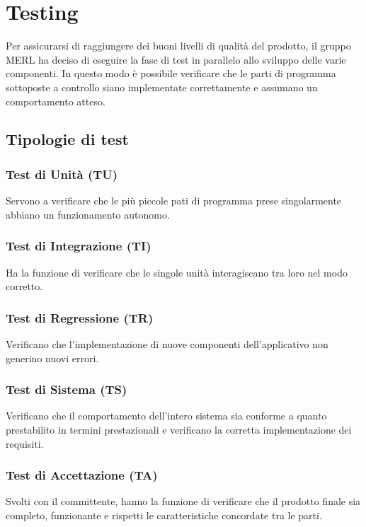 \chapter{Testing}
Per assicurarsi di raggiungere dei buoni livelli di qualità del prodotto, il gruppo MERL ha deciso di eseguire la fase di test in parallelo allo sviluppo delle varie componenti. In questo modo è possibile verificare che le parti di programma sottoposte a controllo siano implementate correttamente e assumano un comportamento atteso.
\section{Tipologie di test}
    \subsection{Test di Unità (TU)}  Servono a verificare che le più piccole pati di programma prese singolarmente abbiano un funzionamento autonomo.
    \subsection{Test di Integrazione (TI)} Ha la funzione di verificare che le singole unità interagiscano tra loro nel modo corretto.
    \subsection{Test di Regressione (TR)} Verificano che l'implementazione di nuove componenti dell'applicativo non generino nuovi errori.
    \subsection{Test di Sistema (TS)} Verificano che il comportamento dell'intero sistema sia conforme a quanto prestabilito in termini prestazionali e verificano la corretta implementazione dei requisiti.
    \subsection{Test di Accettazione (TA)} Svolti con il committente, hanno la funzione di verificare che il prodotto
        finale sia completo, funzionante e rispetti le caratteristiche concordate tra le parti.


